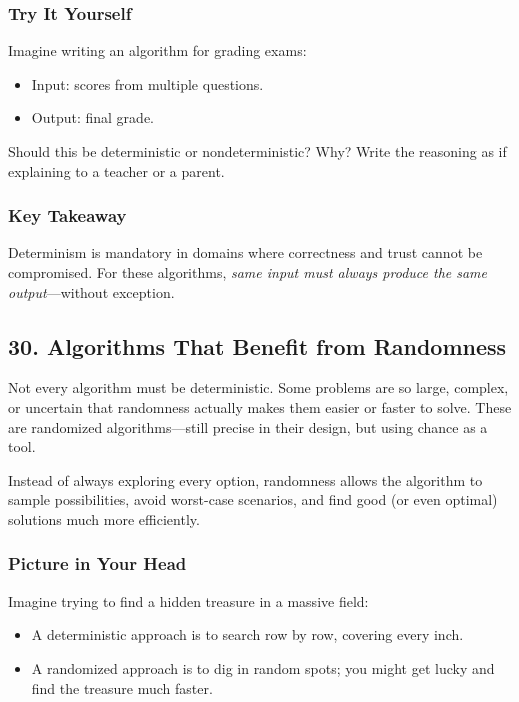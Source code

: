 \documentclass[
  letterpaper,
  DIV=11,
  numbers=noendperiod]{scrreprt}
\providecommand{\tightlist}{%
  \setlength{\itemsep}{0pt}\setlength{\parskip}{0pt}}
\begin{document}
\subsubsection{Try It Yourself}\label{try-it-yourself-28}

Imagine writing an algorithm for grading exams:

\begin{itemize}
\tightlist
\item
  Input: scores from multiple questions.
\item
  Output: final grade.
\end{itemize}

Should this be deterministic or nondeterministic? Why? Write the
reasoning as if explaining to a teacher or a parent.

\subsubsection{Key Takeaway}\label{key-takeaway-27}

Determinism is mandatory in domains where correctness and trust cannot
be compromised. For these algorithms, \emph{same input must always
produce the same output}---without exception.

\subsection{30. Algorithms That Benefit from
Randomness}\label{algorithms-that-benefit-from-randomness}

Not every algorithm must be deterministic. Some problems are so large,
complex, or uncertain that randomness actually makes them easier or
faster to solve. These are randomized algorithms---still precise in
their design, but using chance as a tool.

Instead of always exploring every option, randomness allows the
algorithm to sample possibilities, avoid worst-case scenarios, and find
good (or even optimal) solutions much more efficiently.

\subsubsection{Picture in Your Head}\label{picture-in-your-head-29}

Imagine trying to find a hidden treasure in a massive field:

\begin{itemize}
\tightlist
\item
  A deterministic approach is to search row by row, covering every inch.
\item
  A randomized approach is to dig in random spots; you might get lucky
  and find the treasure much faster.
\end{itemize}
\end{document}
